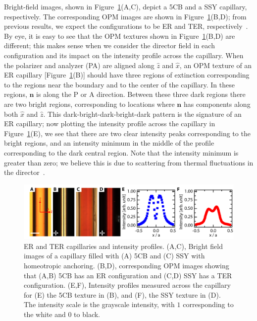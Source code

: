 Bright-field images, shown in Figure~\ref{f:4-StraightCaps}(A,C), depict a 5CB and a SSY capillary, respectively.
The corresponding OPM images are shown in Figure~\ref{f:4-StraightCaps}(B,D); from previous results, we expect the configurations to be ER and TER, respectively~\cite{RN179,RN192}.
By eye, it is easy to see that the OPM textures shown in Figure~\ref{f:4-StraightCaps}(B,D) are different; this makes sense when we consider the director field in each configuration and its impact on the intensity profile across the capillary.
When the polarizer and analyzer (PA) are aligned along $\hat{z}$ and $\hat{x}$, an OPM texture of an ER capillary [Figure~\ref{f:4-StraightCaps}(B)] should have three regions of extinction corresponding to the regions near the boundary and to the center of the capillary.
In these regions, $\mathbf{n}$ is along the P or A direction.
Between these three dark regions there are two bright regions, corresponding to locations where $\mathbf{n}$ has components along both $\hat{x}$ and $\hat{z}$.
This dark-bright-dark-bright-dark pattern is the signature of an ER capillary; now plotting the intensity profile across the capillary in Figure~\ref{f:4-StraightCaps}(E), we see that there are two clear intensity peaks corresponding to the bright regions, and an intensity minimum in the middle of the profile corresponding to the dark central region.
Note that the intensity minimum is greater than zero; we believe this is due to scattering from thermal fluctuations in the director~\cite{RN33}.
\begin{figure}
  \centering
  \includegraphics{figures/C4/Ch4-Figs_StraightCaps.png}
  \caption{ER and TER capillaries and intensity profiles.
  (A,C), Bright field images of a capillary filled with (A) 5CB and (C) SSY with homeotropic anchoring.
  (B,D), corresponding OPM images showing that (A,B) 5CB has an ER configuration and (C,D) SSY has a TER configuration.
  (E,F), Intensity profiles measured across the capillary for (E) the 5CB texture in (B), and (F), the SSY texture in (D). The intensity scale is the grayscale intensity, with $1$ corresponding to the white and $0$ to black.}\label{f:4-StraightCaps}
\end{figure}

